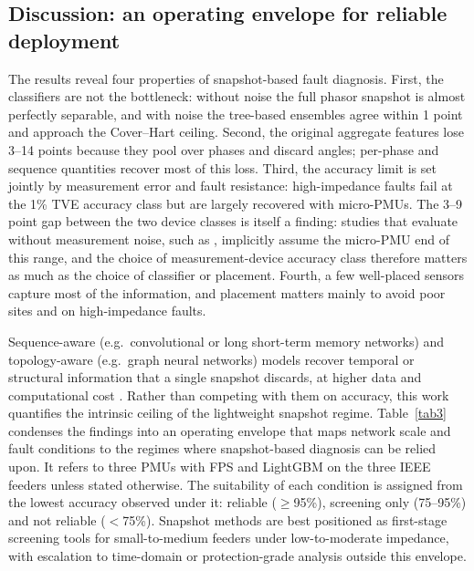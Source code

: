 \documentclass[11pt]{article}
\newenvironment{nw}{}{}
\begin{document}
\subsection{Discussion: an operating envelope for reliable deployment}\label{subsec5_10}

\begin{nw}
The results reveal four properties of snapshot-based fault diagnosis. First, the classifiers are not the bottleneck: without noise the full phasor snapshot is almost perfectly separable, and with noise the tree-based ensembles agree within 1 point and approach the Cover--Hart ceiling. Second, the original aggregate features lose 3--14 points because they pool over phases and discard angles; per-phase and sequence quantities recover most of this loss. Third, the accuracy limit is set jointly by measurement error and fault resistance: high-impedance faults fail at the 1\% TVE accuracy class but are largely recovered with micro-PMUs. The 3--9 point gap between the two device classes is itself a finding: studies that evaluate without measurement noise, such as \cite{khattak2025}, implicitly assume the micro-PMU end of this range, and the choice of measurement-device accuracy class therefore matters as much as the choice of classifier or placement. Fourth, a few well-placed sensors capture most of the information, and placement matters mainly to avoid poor sites and on high-impedance faults.

\end{nw}

Sequence-aware (e.g.\ convolutional or long short-term memory networks) and topology-aware (e.g.\ graph neural networks) models recover temporal or structural information that a single snapshot discards, at higher data and computational cost \cite{siddique2024,karabulut2025}. Rather than competing with them on accuracy, this work quantifies the intrinsic ceiling of the lightweight snapshot regime. Table~\ref{tab3} condenses the findings into an operating envelope that maps network scale and fault conditions to the regimes where snapshot-based diagnosis can be relied upon. It refers to three PMUs with FPS and LightGBM on the three IEEE feeders unless stated otherwise. The suitability of each condition is assigned from the lowest accuracy observed under it: reliable ($\ge$95\%), screening only (75--95\%) and not reliable ($<$75\%). Snapshot methods are best positioned as first-stage screening tools for small-to-medium feeders under low-to-moderate impedance, with escalation to time-domain or protection-grade analysis outside this envelope.
\end{document}
